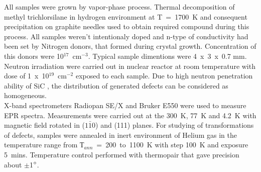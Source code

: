 All samples were grown by vapor-phase process.  Thermal decomposition of methyl trichlorsilane in hydrogen environment at T~=~1700~K and consequent precipitation on graphite needles used to obtain required compound during this process. All samples weren't intentionaly doped and n-type of conductivity had been set by Nitrogen donors, that formed during crystal growth. Concentration of this donors were 10$^{17}$~cm$^{-3}$. Typical sample dimentions were 4~x~3~x~0.7 mm. Neutron irradiation were carried out in nuclear reactor at room temperature with dose of 1~x~10$^{19}$~cm$^{-2}$ exposed to each sample. Due to high neutron penetration ability of SiC \citep{neut}, the distribution of generated defects can be considered as homogeneous.\\
\indent X-band spectrometers Radiopan SE/X and Bruker E550 were used to measure EPR spectra. Measurements were carried out at the 300~K, 77~K and 4.2~K with magnetic field rotated in ($1\bar{1}0$) and (111) planes. For studying of transformations of defects, samples were annealed in inert environment of Helium gas in the temperature range from Т$_{ann}$~=~200~to~1100~K with step 100~K and exposure 5~mins. Temperature control performed with thermopair that gave precision about $\pm$1$\degree$.

